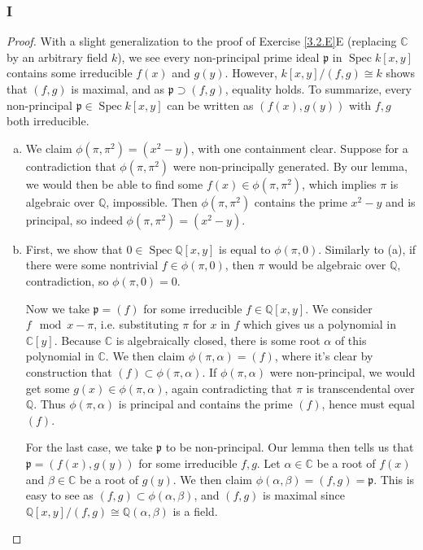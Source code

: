 \documentclass{article}
\newcommand{\Q}{\mathbb{Q}}
\newcommand{\C}{\mathbb{C}}
\newcommand{\frkp}{\mathfrak{p}}
\DeclareMathOperator{\Spec}{\mathrm{Spec}}
\theoremstyle{definition} %
\begin{document}
\subsubsection{I}\label{3.2.I}
\begin{proof}
    With a slight generalization to the proof of Exercise \ref{3.2.E}E (replacing $\C$ by an arbitrary field $k$), we see every non-principal prime ideal $\frkp$ in $\Spec k[x,y]$ contains some irreducible $f(x)$ and $g(y)$. However, $k[x,y]/(f,g)\cong k$ shows that $(f,g)$ is maximal, and as $\frkp\supset (f,g)$, equality holds. To summarize, every non-principal $\frkp \in \Spec k[x,y]$ can be written as $(f(x),g(y))$ with $f,g$ both irreducible.
    \begin{enumerate}[(a)]
        \item We claim $\phi(\pi, \pi^2)=(x^2-y)$, with one containment clear. Suppose for a contradiction that  $\phi(\pi, \pi^2)$ were non-principally generated. By our lemma, we would then be able to find some $f(x)\in \phi(\pi,\pi^2)$, which implies $\pi$ is algebraic over $\Q$, impossible. Then $\phi(\pi,\pi^2)$ contains the prime $x^2-y$ and is principal, so indeed $\phi(\pi,\pi^2)=(x^2-y)$.
        \item First, we show that $0\in \Spec \Q[x,y]$ is equal to $\phi(\pi,0)$. Similarly to (a), if there were some nontrivial $f\in \phi(\pi,0)$, then $\pi$ would be algebraic over $\Q$, contradiction, so $\phi(\pi,0)=0$.

        Now we take $\frkp=(f)$ for some irreducible $f\in \Q[x,y]$. We consider $f \mod x-\pi$, i.e. substituting $\pi$ for $x$ in $f$ which gives us a polynomial in $\C[y]$. Because $\C$ is algebraically closed, there is some root $\alpha$ of this polynomial in $\C$. We then claim $\phi(\pi, \alpha)=(f)$, where it's clear by construction that $(f)\subset \phi(\pi, \alpha)$. If $\phi(\pi, \alpha)$ were non-principal, we would get some $g(x)\in \phi(\pi, \alpha)$, again contradicting that $\pi$ is transcendental over $\Q$. Thus $\phi(\pi, \alpha)$ is principal and contains the prime $(f)$, hence must equal $(f)$.

        For the last case, we take $\frkp$ to be non-principal. Our lemma then tells us that $\frkp=(f(x),g(y))$ for some irreducible $f,g$. Let $\alpha\in \C$ be a root of $f(x)$ and $\beta\in \C$ be a root of $g(y)$. We then claim $\phi(\alpha,\beta)=(f,g)=\frkp$. This is easy to see as $(f,g)\subset \phi(\alpha,\beta)$, and $(f,g)$ is maximal since $\Q[x,y]/(f,g)\cong \Q(\alpha,\beta)$ is a field.
    \end{enumerate}
\end{proof}
\end{document}

